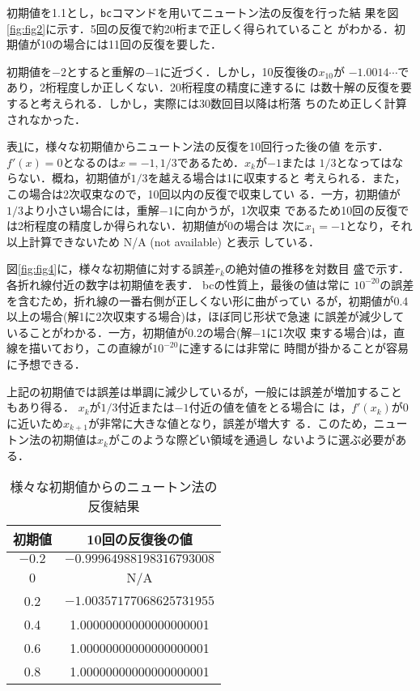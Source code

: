 \documentclass[12pt]{jarticle}
\renewcommand  \[  {\begin{eqnarray}}
\renewcommand  \]  {\end{eqnarray}}
\begin{document}
初期値を1.1とし，\verb+bc+コマンドを用いてニュートン法の反復を行った結
果を図\ref{fig:fig2}に示す．5回の反復で約20桁まで正しく得られていること
がわかる．初期値が10の場合には11回の反復を要した．

初期値を$-2$とすると重解の$-1$に近づく．しかし，10反復後の$x_{10}$が
$-1.0014\cdots$であり，2桁程度しか正しくない．20桁程度の精度に達するに
は数十解の反復を要すると考えられる．しかし，実際には30数回目以降は桁落
ちのため正しく計算されなかった．

表\ref{tab:表1}に，様々な初期値からニュートン法の反復を10回行った後の値
を示す．$f'(x)=0$となるのは$x=-1,1/3$であるため．$x_k$が$-1$または
$1/3$となってはならない．概ね，初期値が$1/3$を越える場合は1に収束すると
考えられる．また，この場合は2次収束なので，10回以内の反復で収束してい
る．一方，初期値が$1/3$より小さい場合には，重解$-1$に向かうが，1次収束
であるため10回の反復では2桁程度の精度しか得られない．初期値が0の場合は
次に$x_1=-1$となり，それ以上計算できないため N/A (not available) と表示
している．

図\ref{fig:fig4}に，様々な初期値に対する誤差$r_k$の絶対値の推移を対数目
盛で示す．各折れ線付近の数字は初期値を表す． bcの性質上，最後の値は常に
$10^{-20}$の誤差を含むため，折れ線の一番右側が正しくない形に曲がってい
るが，初期値が0.4以上の場合(解1に2次収束する場合)は，ほぼ同じ形状で急速
に誤差が減少していることがわかる．一方，初期値が0.2の場合(解$-1$に1次収
束する場合)は，直線を描いており，この直線が$10^{-20}$に達するには非常に
時間が掛かることが容易に予想できる．

上記の初期値では誤差は単調に減少しているが，一般には誤差が増加すること
もあり得る． $x_k$が$1/3$付近または$-1$付近の値を値をとる場合に
は，$f'(x_k)$が0に近いため$x_{k+1}$が非常に大きな値となり，誤差が増大す
る．このため，ニュートン法の初期値は$x_k$がこのような際どい領域を通過し
ないように選ぶ必要がある．

\begin{table}
 \caption{様々な初期値からのニュートン法の反復結果}
 \label{tab:表1}
 \center
\begin{tabular}{c|c}
\hline
初期値 & 10回の反復後の値 \\
\hline
$-0.2$  & $-0.99964988198316793008$ \\
0       & N/A \\
0.2     & $-1.00357177068625731955$ \\
0.4     & 1.00000000000000000001 \\
0.6     & 1.00000000000000000001 \\
0.8     & 1.00000000000000000001 \\
\hline
 \end{tabular}
\end{table}
\end{document}

